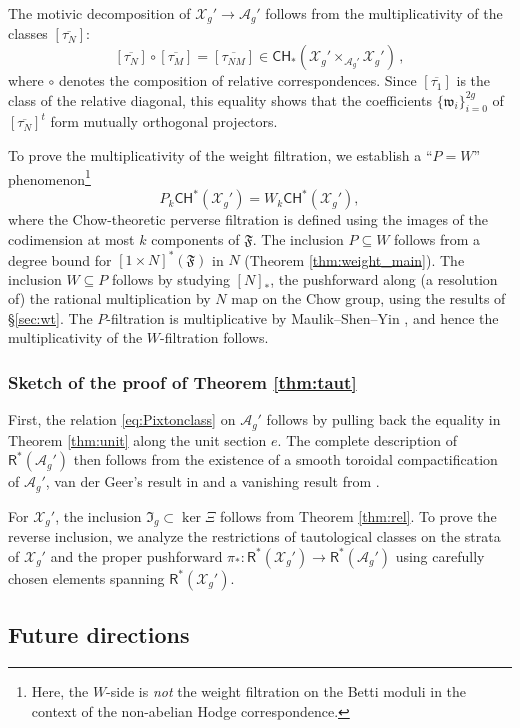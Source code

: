 \documentclass[11pt]{article}
\def\CH{\mathsf{CH}}
\def\R{\mathsf{R}}
\def\A{\mathcal{A}}
\def\X{\mathcal{X}}
\def\fm{\mathfrak{F}}
\newcommand{\w}{\mathfrak{w}}
\theoremstyle{definition}
\begin{document}
The motivic decomposition of $\X_g' \to \A_g'$ follows from the multiplicativity of the classes $[\overline{\tau_N}]$:
\[
[\overline{\tau_N}] \circ [\overline{\tau_M}]
=
[\overline{\tau_{NM}}] \in \CH_*(\X_g' \times_{\A_g'}\X_g')\,,
\]
where $\circ$ denotes the composition of relative correspondences.
Since $[\overline{\tau_1}]$ is the class of the relative diagonal, this equality shows that the coefficients $\{\w_i\}_{i=0}^{2g}$ of $[\overline{\tau_N}]^{t}$ form mutually orthogonal projectors.

To prove the multiplicativity of the weight filtration, we establish a ``$P=W$'' phenomenon\footnote{Here, the $W$-side is {\em not} the weight filtration on the Betti moduli in the context of the non-abelian Hodge correspondence.}
\[
P_k\CH^*(\X_g') = W_k\CH^*(\X_g'),
\]
where the Chow-theoretic perverse filtration is defined using the images of the codimension at most $k$ components of $\fm$. The inclusion $P \subseteq W$ follows from a degree bound for $[1\times N]^*(\fm)$ in $N$ (Theorem \ref{thm:weight_main}).
The inclusion $W \subseteq P$ follows by studying $[N]_*$, the pushforward along (a resolution of) the rational multiplication by $N$ map on the Chow group, using the results of \S\ref{sec:wt}. The $P$-filtration is multiplicative by Maulik--Shen--Yin \cite{PerverseFourierMSY25}, and hence the multiplicativity of the $W$-filtration follows.

\subsubsection{Sketch of the proof of Theorem \ref{thm:taut}}

First, the relation \eqref{eq:Pixtonclass} on $\A_g'$ follows by pulling back the equality in Theorem \ref{thm:unit} along the unit section $e$. The complete description of $\R^*(\A_g')$ then follows from the existence of a smooth toroidal compactification of $\A_g'$, van der Geer's result in \cite{vdG99} and a vanishing result from \cite{CMOP}.

For $\X_g'$, the inclusion $\mathfrak I_g \subset \ker \Xi$ follows from Theorem \ref{thm:rel}. To prove the reverse inclusion, we analyze the restrictions of tautological classes on the strata of $\X_g'$ and the proper pushforward $\pi_* : \R^*(\X_g') \to \R^*(\A_g')$ using carefully chosen elements spanning $\R^*(\X_g')$.

\subsection{Future directions}
\end{document}

